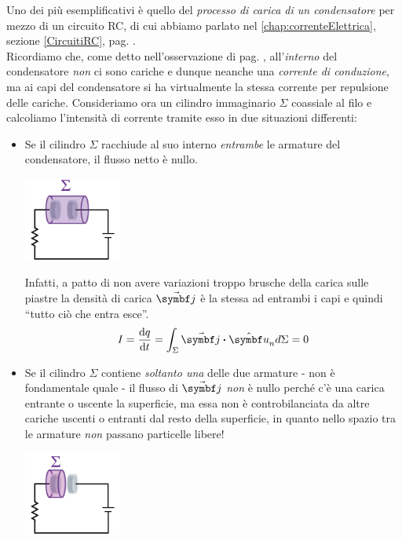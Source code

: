 Uno dei più esemplificativi è quello del \textit{processo di carica di un condensatore} per mezzo di un circuito RC, di cui abbiamo parlato nel \autoref{chap:correnteElettrica}, sezione \ref{CircuitiRC}, pag. \pageref{CircuitiRC}.\\
Ricordiamo che, come detto nell'osservazione di pag. \pageref{correntevariabile}, all'\textit{interno} del condensatore \textit{non} ci sono cariche e dunque neanche una \textit{corrente di conduzione}, ma ai capi del condensatore si ha virtualmente la stessa corrente per repulsione delle cariche. Consideriamo ora un cilindro immaginario $\Sigma$ coassiale al filo e calcoliamo l'intensità di corrente tramite esso in due situazioni differenti: 
\begin{itemize}
	\item Se il cilindro $\Sigma$ racchiude al suo interno \textit{entrambe} le armature del condensatore, il flusso netto è nullo.
	\begin{center}
		\includegraphics[width=0.25\textwidth]{images/chp10/chp10correntedispostamento1.pdf}
	\end{center}
	Infatti, a patto di non avere variazioni troppo brusche della carica sulle piastre la densità di carica $\vba{j}$ è la stessa ad entrambi i capi e quindi ``tutto ciò che entra esce''.
	\begin{equation*}
		I=\dv{q}{t}=\int_{\Sigma}\vba{j}\vdot\vbh{u}_nd\Sigma=0
	\end{equation*}
	\item Se il cilindro $\Sigma$ contiene \textit{soltanto una} delle due armature - non è fondamentale quale - il flusso di $\vba{j}$ \textit{non} è nullo perché c'è una carica entrante o uscente la superficie, ma essa non è controbilanciata da altre cariche uscenti o entranti dal resto della superficie, in quanto nello spazio tra le armature \textit{non} passano particelle libere!
	\begin{center}
		\includegraphics[width=0.25\textwidth]{images/chp10/chp10correntedispostamento2.pdf}
	\end{center}
\end{itemize}
